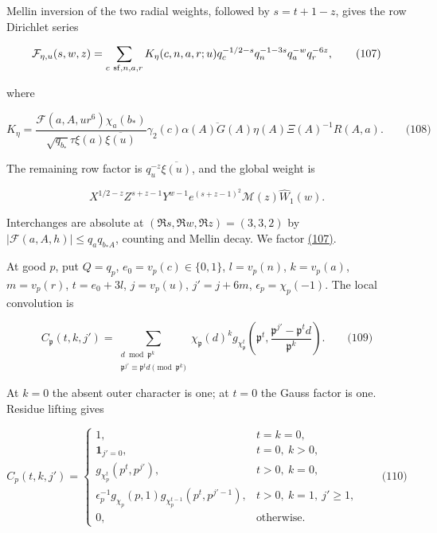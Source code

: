 Mellin inversion of the two radial weights, followed by \(s=t+1-z\), gives the row Dirichlet series

\hypertarget{cf:eq:A.4}{}

\label{cf:eq:A.4}

\[
\mathcal F_{\eta,u}(s,w,z)=
\sum_{c\ {\rm sf},n,a,r} K_\eta(c,n,a,r;u)
q_c^{-1/2-s}q_n^{-1-3s}q_a^{-w}q_r^{-6z},
\qquad\text{(107)}
\]

where

\hypertarget{cf:eq:A.5}{}

\label{cf:eq:A.5}

\[
K_\eta=
\frac{\mathcal F(a,A,ur^6)\chi_a(b_*)}
{\sqrt{q_{b_*}}\tau\xi(a)\overline{\xi(u)}}
\gamma_2(c)\overline{\alpha(A)G(A)}\eta(A)\Xi(A)^{-1}R(A,a).
\qquad\text{(108)}
\]

The remaining row factor is \(q_u^{-z}\overline{\xi(u)}\), and the global weight is

\[
X^{1/2-z}Z^{s+z-1}Y^{w-1}e^{(s+z-1)^2}\mathcal M(z)\widehat W_1(w).
\]

Interchanges are absolute at \((\Re s,\Re w,\Re z)=(3,3,2)\) by \(|\mathcal F(a,A,h)|\le q_aq_{b_*A}\), counting and Mellin decay. We factor \protect\hyperlink{cf:eq:A.4}{(107)}.

At good \(p\), put \(Q=q_p\), \(e_0=v_p(c)\in\{0,1\}\), \(l=v_p(n)\), \(k=v_p(a)\), \(m=v_p(r)\), \(t=e_0+3l\), \(j=v_p(u)\), \(j'=j+6m\), \(\epsilon_p=\chi_p(-1)\). The local convolution is

\hypertarget{cf:eq:A.6}{}

\label{cf:eq:A.6}

\[
C_{\mathfrak p}(t,k,j')=
\sum_{\substack{d\bmod\mathfrak p^k\\\mathfrak p^{j'}\equiv\mathfrak p^td\pmod{\mathfrak p^k}}}
\chi_{\mathfrak p}(d)^k
g_{\chi_{\mathfrak p}^t}\!\left(\mathfrak p^t,
\frac{\mathfrak p^{j'}-\mathfrak p^td}{\mathfrak p^k}\right).
\qquad\text{(109)}
\]

At \(k=0\) the absent outer character is one; at \(t=0\) the Gauss factor is one. Residue lifting gives

\hypertarget{cf:eq:A.7}{}

\label{cf:eq:A.7}

\[
C_p(t,k,j')=
\begin{cases}
1,&t=k=0,\\
\mathbf1_{j'=0},&t=0,\ k>0,\\
g_{\chi_p^t}(p^t,p^{j'}),&t>0,\ k=0,\\
\epsilon_p^{-1}g_{\chi_p}(p,1)g_{\chi_p^{t-1}}(p^t,p^{j'-1}),
&t>0,\ k=1,\ j'\ge1,\\
0,&\text{otherwise}.
\end{cases}
\qquad\text{(110)}
\]

